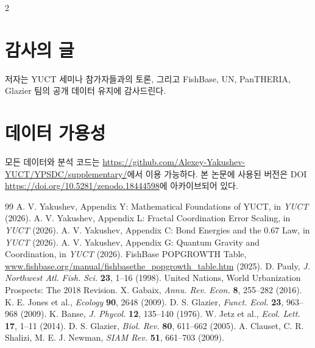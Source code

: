 \documentclass[11pt,a4paper]{article}
\begin{document}
\begin{multicols}{2}
		\section*{감사의 글}
		
		저자는 YUCT 세미나 참가자들과의 토론, 그리고 FishBase, UN, PanTHERIA, Glazier 팀의 공개 데이터 유지에 감사드린다.
		
		\section*{데이터 가용성}
		
		모든 데이터와 분석 코드는 \url{https://github.com/Alexey-Yakushev-YUCT/YPSDC/supplementary/}에서 이용 가능하다. 본 논문에 사용된 버전은 DOI \url{https://doi.org/10.5281/zenodo.18444598}에 아카이브되어 있다.
		
		\begin{thebibliography}{99}
			 A. V. Yakushev, Appendix Y: Mathematical Foundations of YUCT, in \emph{YUCT} (2026).
			 A. V. Yakushev, Appendix L: Fractal Coordination Error Scaling, in \emph{YUCT} (2026).
			 A. V. Yakushev, Appendix C: Bond Energies and the 0.67 Law, in \emph{YUCT} (2026).
			 A. V. Yakushev, Appendix G: Quantum Gravity and Coordination, in \emph{YUCT} (2026).
			 FishBase POPGROWTH Table, \url{www.fishbase.org/manual/fishbasethe_popgrowth_table.htm} (2025).
			 D. Pauly, \emph{J. Northwest Atl. Fish. Sci.} \textbf{23}, 1–16 (1998).
			 United Nations, World Urbanization Prospects: The 2018 Revision.
			 X. Gabaix, \emph{Annu. Rev. Econ.} \textbf{8}, 255–282 (2016).
			 K. E. Jones et al., \emph{Ecology} \textbf{90}, 2648 (2009).
			 D. S. Glazier, \emph{Funct. Ecol.} \textbf{23}, 963–968 (2009).
			 K. Banse, \emph{J. Phycol.} \textbf{12}, 135–140 (1976).
			 W. Jetz et al., \emph{Ecol. Lett.} \textbf{17}, 1–11 (2014).
			 D. S. Glazier, \emph{Biol. Rev.} \textbf{80}, 611–662 (2005).
			 A. Clauset, C. R. Shalizi, M. E. J. Newman, \emph{SIAM Rev.} \textbf{51}, 661–703 (2009).
		\end{thebibliography}
		
	\end{multicols}
\end{document}
